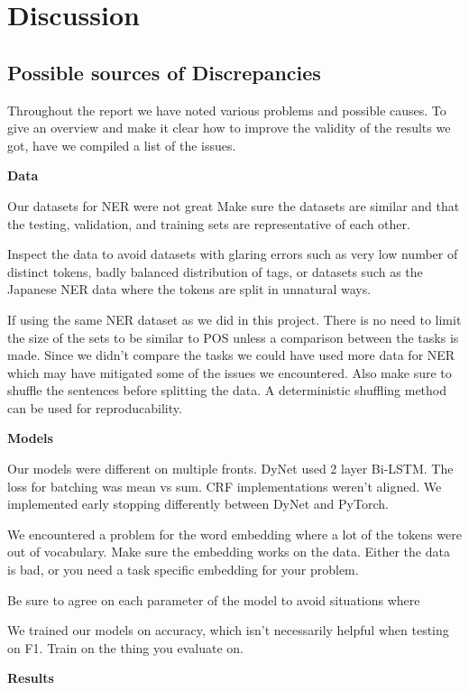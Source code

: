 
\section{Discussion}

\subsection{Possible sources of Discrepancies}

Throughout the report we have noted various problems and possible causes. To
give an overview and make it clear how to improve the validity of the results we
got, have we compiled a list of the issues.

\textbf{Data}

Our datasets for NER were not great 
Make sure the datasets are similar and that the testing, validation, and
training sets are representative of each other. 

Inspect the data to avoid datasets with glaring errors such as very low number
of distinct tokens, badly balanced distribution of tags, or datasets such as the
Japanese NER data where the tokens are split in unnatural ways.

If using the same NER dataset as we did in this project. There is no need to
limit the size of the sets to be similar to POS unless a comparison between the
tasks is made. Since we didn't compare the tasks we could have used more data
for NER which may have mitigated some of the issues we encountered. Also make
sure to shuffle the sentences before splitting the data. A deterministic
shuffling method can be used for reproducability.

\textbf{Models}

Our models were different on multiple fronts.
DyNet used 2 layer Bi-LSTM.
The loss for batching was mean vs sum.
CRF implementations weren't aligned.
We implemented early stopping differently between DyNet and PyTorch.

We encountered a problem for the word embedding where a lot of the tokens were
out of vocabulary.
Make sure the embedding works on the data. Either the data is bad, or you need a
task specific embedding for your problem.

Be sure to agree on each parameter of the model to avoid situations where 

We trained our models on accuracy, which isn't necessarily helpful when testing
on F1. 
Train on the thing you evaluate on.


\textbf{Results}

